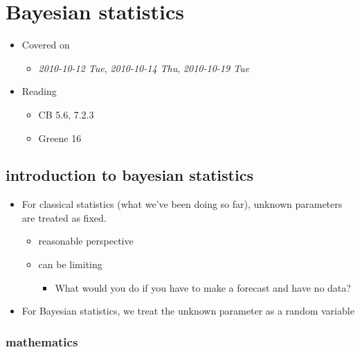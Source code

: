 
\chapter{Bayesian statistics}

\begin{itemize}
\item Covered on
\begin{itemize}
\item \textit{2010-10-12 Tue}, \textit{2010-10-14 Thu}, \textit{2010-10-19 Tue}
\end{itemize}
\item Reading
\begin{itemize}
\item CB 5.6, 7.2.3
\item Greene 16
\end{itemize}
\end{itemize}
\section{introduction to bayesian statistics}
\label{sec-1}

\begin{itemize}
\item For classical statistics (what we've been doing so far), unknown parameters are treated as fixed.
\begin{itemize}
\item reasonable perspective
\item can be limiting
\begin{itemize}
\item What would you do if you have to make a forecast and have no data?
\end{itemize}
\end{itemize}
\item For Bayesian statistics, we treat the unknown parameter as a
      random variable
\end{itemize}
\subsection{mathematics}
\label{sec-1-1}

